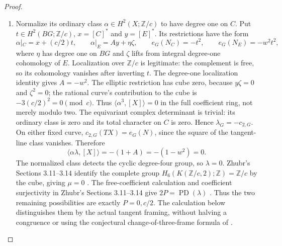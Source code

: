 \begin{proof}
\begin{enumerate}[label=\arabic*.,leftmargin=*]
\item Normalize its ordinary class $\alpha\in H^2(X;\mathbb Z/c)$
to have degree one on $C$. Put $t\in H^2(BG;\mathbb Z/c)$,
$x=[C]^*$ and $y=[E]^*$. Its restrictions have the form
\[
 \alpha|_C=x+(c/2)t,\qquad
 \alpha|_E=A y+\eta\zeta,\qquad
 e_G(N_C)=-t^2,\qquad e_G(N_E)=-w^2t^2,                       \tag{D44.0a}\label{maps:eq:D44.0a}
\]
where $\eta$ has degree one on $BG$ and $\zeta$ lifts from
integral degree-one cohomology of $E$. Localization over
$\mathbb Z/c$ is legitimate: the complement is free, so its
cohomology vanishes after inverting $t$. The degree-one
localization identity gives $A=-w^2$. The elliptic restriction
has cube zero, because $y\zeta=0$ and $\zeta^2=0$; the rational
curve's contribution to the cube is $-3(c/2)^2=0\pmod c$.
Thus $\langle\alpha^3,[X]\rangle=0$ in the full coefficient
ring, not merely modulo two.
The equivariant complex determinant is trivial: its ordinary
class is zero and its total character on $C$ is zero.
Hence $\lambda_G=-c_{2,G}$. On either fixed curve,
$c_{2,G}(TX)=e_G(N)$, since the square of the tangent-line
class vanishes. Therefore
\[
 \langle\alpha\lambda,[X]\rangle=-(1+A)=-(1-w^2)=0.           \tag{D44.0b}\label{maps:eq:D44.0b}
\]
The normalized class detects the cyclic degree-four group, so
$\lambda=0$. Zhubr's Sections 3.11--3.14 identify the complete
group $H_6(K(\mathbb Z/c,2);\mathbb Z)=\mathbb Z/c$ by the cube,
giving $\mu=0$ \cite[Sections 3.11--3.14]{manZhubr75}.
The free-coefficient calculation
and coefficient surjectivity in Zhubr's Sections 3.11--3.14 give
$2P=\operatorname{PD}(\lambda)$
\cite[Theorem 5 and Sections 3.11--3.14]{manZhubr75}.
Thus the two remaining possibilities
are exactly $P=0,c/2$. The calculation below distinguishes them by
the actual tangent framing, without halving a congruence or using
the conjectural change-of-three-frame formula of \cite{ffZhubr13}.


\end{enumerate}
\end{proof}

